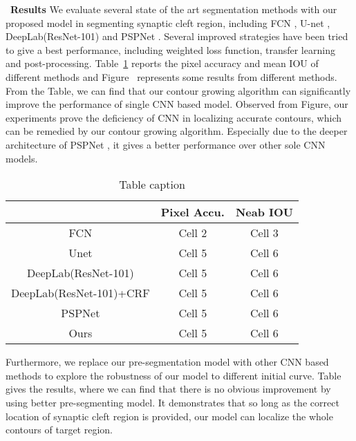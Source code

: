 ~\noindent\textbf{Results}
We evaluate several state of the art segmentation methods with our proposed model in segmenting synaptic cleft region, including FCN \cite{Long2015}, U-net \cite{Ronneberger2015}, DeepLab(ResNet-101) \cite{Chen2016a} and PSPNet \cite{Zhao2016}.
Several improved strategies have been tried to give a best performance, including weighted loss function, transfer learning and post-processing.
Table~\ref{tab:report1} reports the pixel accuracy and mean IOU of different methods and Figure~ represents some results from different methods.
From the Table, we can find that our contour growing algorithm can significantly improve the performance of single CNN based model.
Observed from Figure, our experiments prove the deficiency of CNN in localizing accurate contours, which can be remedied by our contour growing algorithm.
Especially due to the deeper architecture of PSPNet \cite{Zhao2016}, it gives a better performance over other sole CNN models.
\begin{table}[t]
\begin{center}
\caption{Table caption} \label{tab:report1}
\begin{tabular}{|c|c|c|}
  \hline
   & Pixel Accu. & Neab IOU
  \\
  \hline
  FCN & Cell 2 & Cell 3 \\
  Unet & Cell 5 & Cell 6 \\
  DeepLab(ResNet-101) & Cell 5 & Cell 6 \\
  DeepLab(ResNet-101)+CRF & Cell 5 & Cell 6 \\
  PSPNet & Cell 5 & Cell 6 \\
  Ours & Cell 5 & Cell 6 \\
  \hline
\end{tabular}
\end{center}
\end{table}

Furthermore, we replace our pre-segmentation model with other CNN based methods to explore the robustness of our model to different initial curve.
Table gives the results, where we can find that there is no obvious improvement by using better pre-segmenting model.
It demonstrates that so long as the correct location of synaptic cleft region is provided, our model can localize the whole contours of target region.

